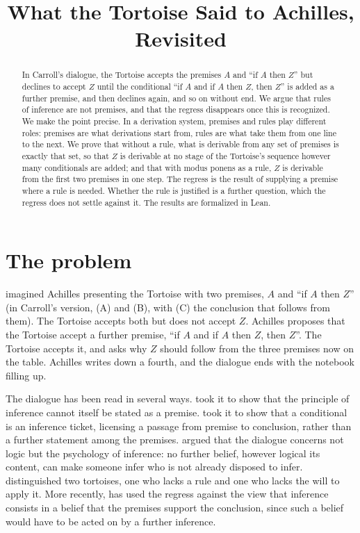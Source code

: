 \documentclass{situationist-preprint}
\title{What the Tortoise Said to Achilles, Revisited}
\begin{document}
\maketitle

\begin{abstract}
In Carroll's dialogue, the Tortoise accepts the premises $A$ and \enquote{if $A$ then $Z$} but declines to accept $Z$ until the conditional \enquote{if $A$ and if $A$ then $Z$, then $Z$} is added as a further premise, and then declines again, and so on without end. We argue that rules of inference are not premises, and that the regress disappears once this is recognized. We make the point precise. In a derivation system, premises and rules play different roles: premises are what derivations start from, rules are what take them from one line to the next. We prove that without a rule, what is derivable from any set of premises is exactly that set, so that $Z$ is derivable at no stage of the Tortoise's sequence however many conditionals are added; and that with modus ponens as a rule, $Z$ is derivable from the first two premises in one step. The regress is the result of supplying a premise where a rule is needed. Whether the rule is justified is a further question, which the regress does not settle against it. The results are formalized in Lean.
\end{abstract}

\section{The problem}

\citet{Carroll1895} imagined Achilles presenting the Tortoise with two premises, $A$ and \enquote{if $A$ then $Z$} (in Carroll's version, (A) and (B), with (C) the conclusion that follows from them). The Tortoise accepts both but does not accept $Z$. Achilles proposes that the Tortoise accept a further premise, \enquote{if $A$ and if $A$ then $Z$, then $Z$}. The Tortoise accepts it, and asks why $Z$ should follow from the three premises now on the table. Achilles writes down a fourth, and the dialogue ends with the notebook filling up.

The dialogue has been read in several ways. \citet[\S 38]{Russell1903} took it to show that the principle of inference cannot itself be stated as a premise. \citet{Ryle1950} took it to show that a conditional is an inference ticket, licensing a passage from premise to conclusion, rather than a further statement among the premises. \citet{Stroud1979} argued that the dialogue concerns not logic but the psychology of inference: no further belief, however logical its content, can make someone infer who is not already disposed to infer. \citet{Smiley1995} distinguished two tortoises, one who lacks a rule and one who lacks the will to apply it. More recently, \citet{Boghossian2003,Boghossian2014} has used the regress against the view that inference consists in a belief that the premises support the conclusion, since such a belief would have to be acted on by a further inference.
\end{document}
